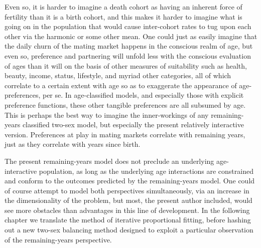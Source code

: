 Even so, it is harder to imagine a death cohort as having an inherent 
force of fertility than it is a birth cohort, and this makes it harder to 
imagine what is going on in the population that would cause inter-cohort rates 
to tug upon each other via the harmonic or some other mean. One could just as
easily imagine that the daily churn of the mating market happens in the
conscious realm of age, but even so, preference and partnering will unfold less
with the conscious evaluation of ages than it will on the basis of other
measures of suitability such as health, beauty, income, status, lifestyle, and
myriad other categories, all of which correlate to a certain extent with age so
as to exaggerate the appearance of age-preferences, per se. In age-classified
models, and especially those with explicit preference functions, these other
tangible preferences are all subsumed by age. This is perhaps the best way to
imagine the inner-workings of any remaining-years classified two-sex model, but
especially the present relatively interactive version. Preferences at play in
mating markets correlate with remaining years, just as they correlate with years
since birth.

The present remaining-years model does not preclude an
underlying age-interactive population, as long as the underlying age
interactions are constrained and conform to the outcomes predicted by the
remaining-years model. One could of course attempt to model both perspectives
simultaneously, via an increase in the dimensionality of the problem, but most,
the present author included, would see more obstacles than advantages in this
line of development. In the following chapter we translate the method of
iterative proportional fitting, before hashing out a new two-sex
balancing method designed to exploit a particular observation of the
remaining-years perspective.
\FloatBarrier